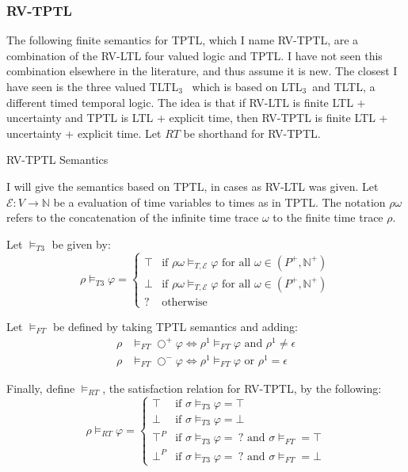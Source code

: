 \documentclass[a4paper]{article}
\newcommand{\tand}{\text{ and }}
\newcommand{\tor}{\text{ or }}
\newcommand{\fall}{\text{ for all }}
\newcommand{\sn}{\bigcirc^+}
\newcommand{\wn}{\bigcirc^-}
\newcommand{\eval}{\mathcal{E}}
\newcommand{\ltlt}{LTL$_3$}
\begin{document}
\subsubsection{RV-TPTL} The following finite semantics for TPTL, which I name RV-TPTL, are a combination of the RV-LTL four valued logic and TPTL. I have not seen this combination elsewhere in the literature, and thus assume it is new. The closest I have seen is the three valued TLTL$_3$~\autocite[6]{arafat2005runtime} which is based on \ltlt\ and TLTL, a different timed temporal logic. The idea is that if RV-LTL is finite LTL + uncertainty and TPTL is LTL + explicit time, then RV-TPTL is finite LTL + uncertainty + explicit time. Let $RT$ be shorthand for RV-TPTL.
\begin{defn}{RV-TPTL Semantics}

  I will give the semantics based on TPTL, in cases as RV-LTL was given. Let $\eval:V\to\mathbb{N}$ be a evaluation of time variables to times as in TPTL.
  The notation $\rho\omega$ refers to the concatenation of the infinite time trace $\omega$ to the finite time trace $\rho$.

  Let $\vDash_{T3}$ be given by:
  \[\rho\vDash_{T3}\varphi = \begin{cases}
      \top & \text{if } \rho\omega \vDash_{T,\eval} \varphi \fall \omega \in (P^+,\mathbb{N}^+)\\
      \bot & \text{if }  \rho\omega \vDash_{T,\eval} \varphi \fall \omega \in (P^+,\mathbb{N}^+)\\
      ? & \text{otherwise}
    \end{cases}
  \]

  Let $\vDash_{FT}$ be defined by taking TPTL semantics and adding:
  \begin{align*}
    \rho&\vDash_{FT}\sn\varphi \iff \rho^1\vDash_{FT}\varphi \tand \rho^1 \neq \epsilon\\
    \rho&\vDash_{FT}\wn\varphi \iff \rho^1\vDash_{FT}\varphi \tor \rho^1 = \epsilon
  \end{align*}

  Finally, define $\vDash_{RT}$, the satisfaction relation for RV-TPTL, by the following:
  \[\rho\vDash_{RT}\varphi =
    \begin{cases}
      \top & \text{if } \sigma \vDash_{T3} \varphi = \top\\
      \bot & \text{if } \sigma \vDash_{T3} \varphi = \bot\\
      \top^P & \text{if } \sigma \vDash_{T3} \varphi = ~?\tand \sigma\vDash_{FT} = \top \\
      \bot^P & \text{if } \sigma \vDash_{T3} \varphi = ~?\tand \sigma\vDash_{FT} = \bot
    \end{cases}
  \]
\end{defn}
\end{document}
